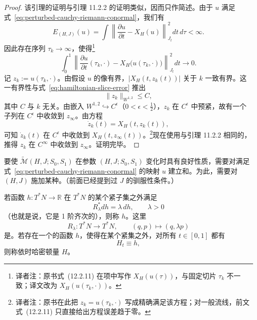 \begin{proof}
该引理的证明与引理 11.2.2 的证明类似，因而只作简述。由于 $u$ 满足式~\eqref{eq:perturbed-cauchy-riemann-conormal}，我们有
\[
  E_{(H,J)}(u)
  =\int\left\lVert\frac{\partial u}{\partial t}-X_H(u)\right\rVert_{J_t}^2
    dt\,d\tau
  <\infty.
\]
因此存在序列 $\tau_k\to\infty$，使得\footnote{译者注：原书式~(12.2.11) 在\personHamilton{}项中写作 $X_H(u(\tau))$，与固定切片 $\tau_k$ 不一致；译文改为 $X_H(u(\tau_k,\mathord\cdot))$。}
\begin{equation}
  \int_0^1
  \left\lVert
    \frac{\partial u}{\partial t}(\tau_k,\mathord\cdot)
    -X_H\bigl(u(\tau_k,\mathord\cdot)\bigr)
  \right\rVert_{J_t}^2dt
  \longrightarrow0.
  \label{eq:hamiltonian-slice-error}
\end{equation}
记 $z_k:=u(\tau_k,\mathord\cdot)$。由假设 $u$ 的像有界，$|X_H(t,z_k(t))|$ 关于 $k$ 一致有界。这一有界性与式~\eqref{eq:hamiltonian-slice-error} 推出
\[
  \lVert z_k\rVert_{W^{1,2}}\le C,
\]
其中 $C$ 与 $k$ 无关。由\personSobolev{}嵌入 $W^{1,2}\hookrightarrow C^\epsilon$（$0<\epsilon<\frac12$），$z_k$ 在 $C^\epsilon$ 中预紧，故有一个子列在 $C^\epsilon$ 中收敛到 $z_\infty$。由方程
\[
  \dot z_k(t)=X_H(t,z_k(t)),
\]
可知 $\dot z_k(t)$ 在 $C^\epsilon$ 中收敛到 $X_H(t,z_\infty(t))$。\footnote{译者注：原书在此把 $z_k=u(\tau_k,\mathord\cdot)$ 写成精确满足该\personHamilton{}方程；对一般\personFloer{}流线，前文式~(12.2.11) 只直接给出方程误差趋于零。}现在使用与引理 11.2.2 相同的\termBootstrapArgument{}，推得 $z_k$ 在 $C^\infty$ 中收敛到 $z_\infty$。证明完毕。
\end{proof}

要使 $\widetilde{\mathcal M}(H,J;S_0,S_1)$ 在参数 $(H,J;S_0,S_1)$ 变化时具有良好性质，需要对满足式~\eqref{eq:perturbed-cauchy-riemann-conormal} 的映射 $u$ 建立\termAprioriEnergyBound{}和\termCzeroBound{}。为此，需要对 $(H,J)$ 施加某种\termTamenessAtInfinity{}。（前面已经提到过 $J$ 的驯服性条件。）

\begin{definition}
\label{def:conic-at-infinity}
若函数 $h:T^*N\to\mathbb R$ 在 $T^*N$ 的某个紧子集之外满足
\[
  R_\lambda^*dh=\lambda\,dh,
  \qquad \lambda>0
\]
（也就是说，它是 1 阶齐次的），则称 $h$\termConicAtInfinity{}。这里
\[
  R_\lambda:T^*N\longrightarrow T^*N,
  \qquad(q,p)\longmapsto(q,\lambda p)
\]
是\termFiberMultiplicationMap{}。若存在一个\termConicAtInfinity{}的函数 $h$，使得在某个紧集之外，对所有 $t\in[0,1]$ 都有
\[
  H_t\equiv h,
\]
则称依时哈密顿量 $H$\termConicAtInfinity{}。
\end{definition}

